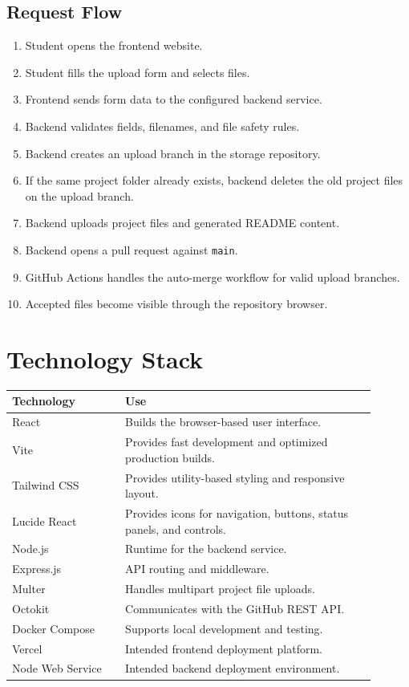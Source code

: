 \documentclass[12pt,a4paper]{article}
\begin{document}
\subsection{Request Flow}

\begin{enumerate}[leftmargin=*]
    \item Student opens the frontend website.
    \item Student fills the upload form and selects files.
    \item Frontend sends form data to the configured backend service.
    \item Backend validates fields, filenames, and file safety rules.
    \item Backend creates an upload branch in the storage repository.
    \item If the same project folder already exists, backend deletes the old project files on the upload branch.
    \item Backend uploads project files and generated README content.
    \item Backend opens a pull request against \texttt{main}.
    \item GitHub Actions handles the auto-merge workflow for valid upload branches.
    \item Accepted files become visible through the repository browser.
\end{enumerate}

\section{Technology Stack}

\begin{longtable}{p{0.28\linewidth} p{0.62\linewidth}}
\toprule
\textbf{Technology} & \textbf{Use} \\
\midrule
React & Builds the browser-based user interface. \\
Vite & Provides fast development and optimized production builds. \\
Tailwind CSS & Provides utility-based styling and responsive layout. \\
Lucide React & Provides icons for navigation, buttons, status panels, and controls. \\
Node.js & Runtime for the backend service. \\
Express.js & API routing and middleware. \\
Multer & Handles multipart project file uploads. \\
Octokit & Communicates with the GitHub REST API. \\
Docker Compose & Supports local development and testing. \\
Vercel & Intended frontend deployment platform. \\
Node Web Service & Intended backend deployment environment. \\
\bottomrule
\end{longtable}
\end{document}
